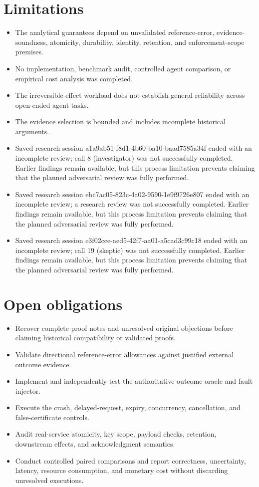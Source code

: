 \documentclass[11pt]{article}
\begin{document}
\section{Limitations}
\begin{itemize}
\item The analytical guarantees depend on unvalidated reference-error, evidence-soundness, atomicity, durability, identity, retention, and enforcement-scope premises.
\item No implementation, benchmark audit, controlled agent comparison, or empirical cost analysis was completed.
\item The irreversible-effect workload does not establish general reliability across open-ended agent tasks.
\item The evidence selection is bounded and includes incomplete historical arguments.
\item Saved research session a1a9ab51-f8d1-4b60-ba10-baad7585a34f ended with an incomplete review; call 8 (investigator) was not successfully completed. Earlier findings remain available, but this process limitation prevents claiming that the planned adversarial review was fully performed.
\item Saved research session ebc7ac05-823c-4a02-9590-1e9f9726e807 ended with an incomplete review; a research review was not successfully completed. Earlier findings remain available, but this process limitation prevents claiming that the planned adversarial review was fully performed.
\item Saved research session e3f02cce-aed5-42f7-aa01-a5cad3c99c18 ended with an incomplete review; call 19 (skeptic) was not successfully completed. Earlier findings remain available, but this process limitation prevents claiming that the planned adversarial review was fully performed.
\end{itemize}
\section{Open obligations}
\begin{itemize}
\item Recover complete proof notes and unresolved original objections before claiming historical compatibility or validated proofs.
\item Validate directional reference-error allowances against justified external outcome evidence.
\item Implement and independently test the authoritative outcome oracle and fault injector.
\item Execute the crash, delayed-request, expiry, concurrency, cancellation, and false-certificate controls.
\item Audit real-service atomicity, key scope, payload checks, retention, downstream effects, and acknowledgment semantics.
\item Conduct controlled paired comparisons and report correctness, uncertainty, latency, resource consumption, and monetary cost without discarding unresolved executions.
\end{itemize}
\end{document}
